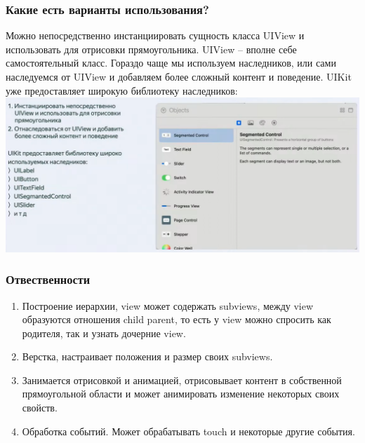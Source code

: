\documentclass{article}
\begin{document}
    \subsubsection{Какие есть варианты использования?}
    Можно непосредственно инстанциировать сущность класса UIView и использовать для отрисовки прямоугольника. UIView -- вполне себе самостоятельный класс. Гораздо чаще мы используем наследников, или сами наследуемся от UIView и добавляем более сложный контент и поведение. 
    \newline
    UIKit уже предоставляет широкую библиотеку наследников: 
    \newline
    \includegraphics[scale = 0.4]{pic/Снимок экрана 2023-07-31 в 20.09.32.png}
    \subsubsection{Отвественности}
    \begin{enumerate}
        \item Построение иерархии, view может содержать subviews, между view образуются отношения child parent, то есть у view можно спросить как родителя, так и узнать дочерние view. 
        \item Верстка, настраивает положения и размер своих subviews. 
        \item  Занимается отрисовкой и анимацией, отрисовывает контент в собственной прямоугольной области и может анимировать изменение некоторых своих свойств. 
        \item Обработка событий. Может обрабатывать touch и некоторые другие события. 
    \end{enumerate}
\end{document}
